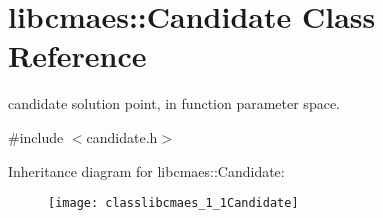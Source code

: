 \hypertarget{classlibcmaes_1_1Candidate}{\section{libcmaes\+:\+:Candidate Class Reference}
\label{classlibcmaes_1_1Candidate}
}


candidate solution point, in function parameter space.  




{\ttfamily \#include $<$candidate.\+h$>$}

Inheritance diagram for libcmaes\+:\+:Candidate\+:\begin{figure}[H]
\begin{center}
\leavevmode
\texttt{[image: classlibcmaes\_1\_1Candidate]}
\end{center}
\end{figure}
